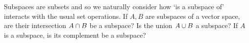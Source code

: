 

\begin{Exercise}[
name={},
title={}, 
difficulty=0,
origin={\cite{JH}}]
Subspaces are subsets and so we naturally consider how `is a subspace of'
interacts with the usual set operations.
\Question If \( A,B \) are subspaces of a vector space, are
        their intersection
        \( A\cap B \) be a subspace?
\Question Is the union \( A\cup B \) a subspace?
\Question If \( A \) is a subspace, is its complement be a subspace?

\end{Exercise}

